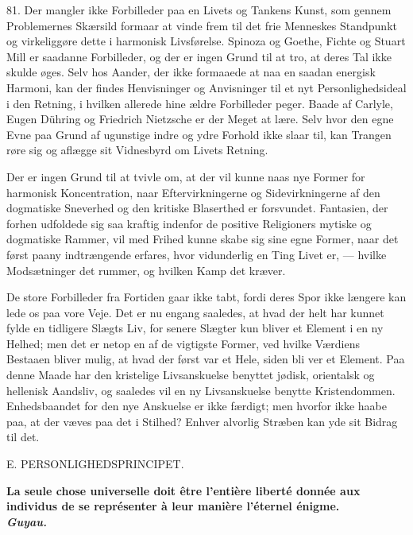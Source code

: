 \documentclass[12pt,a4paper,openany]{book}
\newcommand{\opage}[1]{\marginnote{\footnotesize\textit{[#1]}}}
\begin{document}
81. Der mangler ikke Forbilleder paa en Livets og Tankens Kunst, som
gennem Problemernes Skærsild formaar at vinde frem til det frie
Menneskes Standpunkt og virkeliggøre dette i harmonisk Livsførelse.
Spinoza og Goethe, Fichte og Stuart Mill er saadanne Forbilleder, og der
er ingen Grund til at tro, at deres Tal ikke skulde øges. Selv hos
Aander, der ikke formaaede at naa en saadan energisk Harmoni, kan der
findes Henvisninger og Anvisninger til et nyt Personlighedsideal i den
Retning, i hvilken allerede hine ældre Forbilleder peger. Baade af
Carlyle, Eugen Dühring og Friedrich Nietzsche er der Meget at lære. Selv
hvor den egne Evne paa Grund af ugunstige indre og ydre Forhold ikke
slaar til, kan Trangen røre sig og aflægge sit Vidnesbyrd om Livets
Retning.

Der er ingen Grund til at tvivle om, at der vil kunne naas nye Former
for harmonisk Koncentration, naar Eftervirkningerne og Sidevirkningerne
af den dogmatiske Sneverhed og den kritiske Blaserthed er forsvundet.
Fantasien, der forhen udfoldede sig saa kraftig indenfor de positive
Religioners mytiske og dogmatiske Rammer, vil med Frihed kunne skabe sig
sine egne Former, naar det først paany indtrængende erfares, hvor
vidunderlig en Ting Livet er, --- hvilke Modsætninger det rummer, og
hvilken Kamp det kræver.

De store Forbilleder fra Fortiden gaar ikke tabt, fordi deres Spor ikke
længere kan lede os paa vore Veje. Det er nu engang saaledes, at hvad
der helt har kunnet fylde en tidligere Slægts Liv, for senere Slægter
kun bliver et Element i en ny Helhed; men det er netop en af de
vigtigste Former, ved hvilke Værdiens Bestaaen bliver mulig, at hvad der
først var et Hele, siden bli%
\opage{189}ver et Element. Paa denne Maade har den kristelige
Livsanskuelse benyttet jødisk, orientalsk og hellenisk Aandsliv, og
saaledes vil en ny Livsanskuelse benytte Kristendommen. Enhedsbaandet
for den nye Anskuelse er ikke færdigt; men hvorfor ikke haabe paa, at
der væves paa det i Stilhed? Enhver alvorlig Stræben kan yde sit Bidrag
til det.

\clearpage

\opage{190}\begin{center}E. PERSONLIGHEDSPRINCIPET.\end{center}

\begin{flushright}\begin{minipage}{0.55\textwidth}\small\bfseries
La seule chose universelle doit être l’entière liberté donnée aux
individus de se représenter à leur manière l’éternel énigme.\\
\hfill\textit{Guyau.}
\end{minipage}\end{flushright}
\end{document}
